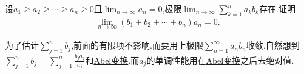 \documentclass[../../main.tex]{subfiles}%
\begin{document}
\begin{proposition}[经典乘积极限结论]\label{proposition:经典乘积极限结论}
设\(a_1 \geqslant a_2 \geqslant \cdots \geqslant a_n \geqslant 0\)且\(\lim_{n \to \infty} a_n = 0\),极限\(\lim_{n \to \infty} \sum\limits_{k = 1}^{n} a_k b_k\)存在.证明
\begin{align*}
\lim_{n \to \infty} (b_1 + b_2 + \cdots + b_n)a_n = 0. 
\end{align*}
\end{proposition}
\begin{note}
为了估计\(\sum\limits_{j = 1}^{n} b_j\),前面的有限项不影响.而要用上极限\(\sum\limits_{n = 1}^{\infty} a_n b_n\)收敛,自然想到\(\sum\limits_{j = 1}^{n} b_j = \sum\limits_{j = 1}^{n} \frac{b_j a_j}{a_j}\)和\hyperref[theorem:Abel变换]{Abel变换}.而\(a_j\)的单调性能用在\hyperref[theorem:Abel变换]{Abel变换}之后去绝对值.
\end{note}
\end{document}
